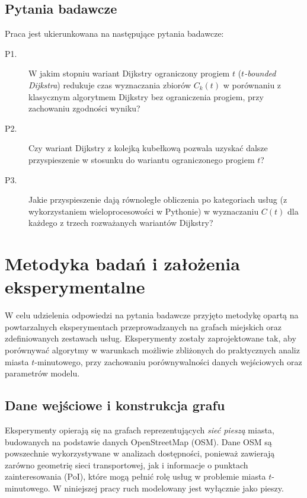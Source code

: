 \clearpage

\subsection{Pytania badawcze}

Praca jest ukierunkowana na następujące pytania badawcze:
\begin{description}
  \item[P1.] W jakim stopniu wariant Dijkstry ograniczony progiem $t$ (\emph{$t$-bounded Dijkstra})
            redukuje czas wyznaczania zbiorów $C_k(t)$ w porównaniu z klasycznym algorytmem Dijkstry bez ograniczenia
            progiem, przy zachowaniu zgodności wyniku?

  \item[P2.] Czy wariant Dijkstry z kolejką kubełkową pozwala uzyskać
            dalsze przyspieszenie w stosunku do wariantu ograniczonego progiem $t$?

  \item[P3.] Jakie przyspieszenie dają równoległe obliczenia po kategoriach usług
            (z wykorzystaniem wieloprocesowości w Pythonie) w wyznaczaniu $C(t)$
            dla każdego z trzech rozważanych wariantów Dijkstry?
\end{description}

\section{Metodyka badań i założenia eksperymentalne}
\label{sec:intro:metodyka}

W celu udzielenia odpowiedzi na pytania badawcze przyjęto metodykę opartą na powtarzalnych
eksperymentach przeprowadzanych na grafach miejskich oraz zdefiniowanych zestawach usług.
Eksperymenty zostały zaprojektowane tak, aby porównywać algorytmy w warunkach możliwie zbliżonych
do praktycznych analiz miasta $t$-minutowego, przy zachowaniu porównywalności danych wejściowych
oraz parametrów modelu.

\subsection{Dane wejściowe i konstrukcja grafu}
\label{sec:intro:metodyka:dane}

Eksperymenty opierają się na grafach reprezentujących \emph{sieć pieszą} miasta, budowanych
na podstawie danych OpenStreetMap (OSM). Dane OSM są powszechnie wykorzystywane w analizach
dostępności, ponieważ zawierają zarówno geometrię sieci transportowej, jak i informacje
o punktach zainteresowania (PoI), które mogą pełnić rolę usług w problemie miasta $t$-minutowego.
W niniejszej pracy ruch modelowany jest wyłącznie jako pieszy.

